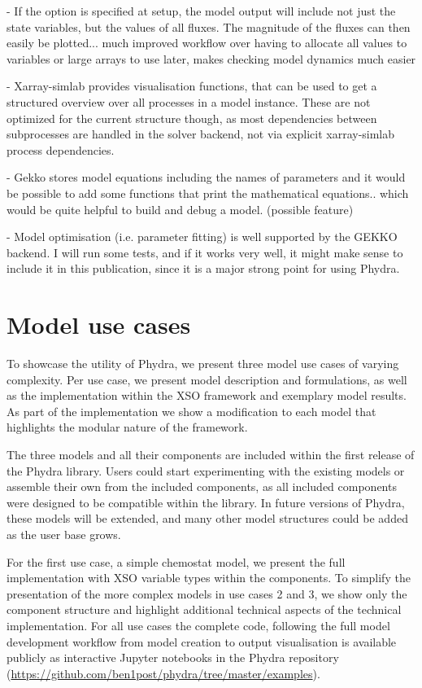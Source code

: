 \documentclass[journal abbreviation, manuscript]{copernicus}
\begin{document}
- If the option is specified at setup, the model output will include not just the state variables, but the values of all fluxes. The magnitude of the fluxes can then easily be plotted... much improved workflow over having to allocate all values to variables or large arrays to use later, makes checking model dynamics much easier

- Xarray-simlab provides visualisation functions, that can be used to get a structured overview over all processes in a model instance. These are not optimized for the current structure though, as most dependencies between subprocesses are handled in the solver backend, not via explicit xarray-simlab process dependencies.

- Gekko stores model equations including the names of parameters and it would be possible to add some functions that print the mathematical equations.. which would be quite helpful to build and debug a model. (possible feature)

- Model optimisation (i.e. parameter fitting) is well supported by the GEKKO backend. I will run some tests, and if it works very well, it might make sense to include it in this publication, since it is a major strong point for using Phydra.


\clearpage


\section{Model use cases} \label{Section:UseCases}

To showcase the utility of Phydra, we present three model use cases of varying complexity. Per use case, we present model description and formulations, as well as the implementation within the XSO framework and exemplary model results. As part of the implementation we show a modification to each model that highlights the modular nature of the framework.

The three models and all their components are included within the first release of the Phydra library. Users could start experimenting with the existing models or assemble their own from the included components, as all included components were designed to be compatible within the library. In future versions of Phydra, these models will be extended, and many other model structures could be added as the user base grows.

For the first use case, a simple chemostat model, we present the full implementation with XSO variable types within the components. To simplify the presentation of the more complex models in use cases 2 and 3, we show only the component structure and highlight additional technical aspects of the technical implementation. For all use cases the complete code, following the full model development workflow from model creation to output visualisation is available publicly as interactive Jupyter notebooks in the Phydra repository (\url{https://github.com/ben1post/phydra/tree/master/examples}).
\end{document}
